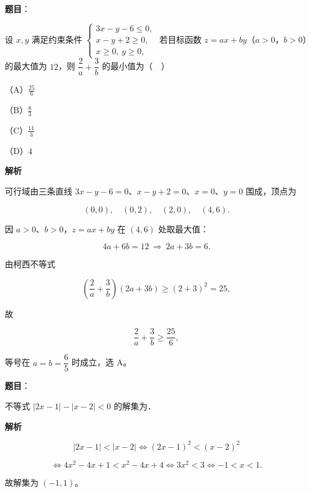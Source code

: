 \begin{answer}

\textbf{题目}：

设 $x,y$ 满足约束条件 $\begin{cases}3x-y-6\leqslant0,\\ x-y+2\geqslant0,\\ x\geqslant0,\ y\geqslant0,\end{cases}$ 若目标函数 $z=ax+by$（$a>0$，$b>0$）的最大值为 $12$，则 $\dfrac2a+\dfrac3b$ 的最小值为（　）

（A）$\frac{25}{6}$

（B）$\frac83$

（C）$\frac{11}3$

（D）$4$

\textbf{解析}

可行域由三条直线 $3x-y-6=0$、$x-y+2=0$、$x=0$、$y=0$ 围成，顶点为

\nopagebreak[4]
\[(0,0),\quad (0,2),\quad (2,0),\quad (4,6).\]

因 $a>0$、$b>0$，$z=ax+by$ 在 $(4,6)$ 处取最大值：

\nopagebreak[4]
\[4a+6b=12\ \Longrightarrow\ 2a+3b=6 .\]

由柯西不等式

\nopagebreak[4]
\[\left(\frac2a+\frac3b\right)(2a+3b)\geqslant(2+3)^2=25,\]

故

\nopagebreak[4]
\[\frac2a+\frac3b\geqslant\frac{25}{6},\]

等号在 $a=b=\dfrac65$ 时成立，选 A。


\end{answer}
\begin{answer}

\textbf{题目}：

不等式 $|2x-1|-|x-2|<0$ 的解集为\gkblank{}．

\textbf{解析}

\nopagebreak[4]
\[|2x-1|<|x-2|\iff (2x-1)^2<(x-2)^2\]

\nopagebreak[4]
\[\iff 4x^2-4x+1<x^2-4x+4\iff 3x^2<3\iff -1<x<1 .\]

故解集为 $(-1,1)$。


\end{answer}
